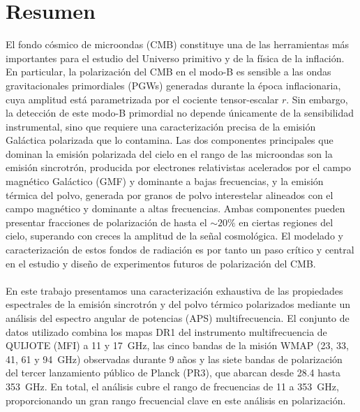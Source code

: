 \section*{Resumen}

El fondo cósmico de microondas (CMB) constituye una de las herramientas más importantes para el estudio del Universo primitivo y de la física de la inflación. En particular, la polarización del CMB en el modo-B es sensible a las ondas gravitacionales primordiales (PGWs) generadas durante la época inflacionaria, cuya amplitud está parametrizada por el cociente tensor-escalar $r$. Sin embargo, la detección de este modo-B primordial no depende únicamente de la sensibilidad instrumental, sino que requiere una caracterización precisa de la emisión Galáctica polarizada que lo contamina. Las dos componentes principales que dominan la emisión polarizada del cielo en el rango de las microondas son la emisión sincrotrón, producida por electrones relativistas acelerados por el campo magnético Galáctico (GMF) y dominante a bajas frecuencias, y la emisión térmica del polvo, generada por granos de polvo interestelar alineados con el campo magnético y dominante a altas frecuencias. Ambas componentes pueden presentar fracciones de polarización de hasta el $\sim 20\%$ en ciertas regiones del cielo, superando con creces la amplitud de la señal cosmológica. El modelado y caracterización de estos fondos de radiación es por tanto un paso crítico y central en el estudio y diseño de experimentos futuros de polarización del CMB.

\paragraph{}

En este trabajo presentamos una caracterización exhaustiva de las propiedades espectrales de la emisión sincrotrón y del polvo térmico polarizados mediante un análisis del espectro angular de potencias (APS) multifrecuencia. El conjunto de datos utilizado combina los mapas DR1 del instrumento multifrecuencia de QUIJOTE (MFI) a 11 y 17~GHz, las cinco bandas de la misión WMAP (23, 33, 41, 61 y 94~GHz) observadas durante 9 años y las siete bandas de polarización del tercer lanzamiento público de Planck (PR3), que abarcan desde 28.4 hasta 353~GHz. En total, el análisis cubre el rango de frecuencias de 11 a 353~GHz, proporcionando un gran rango frecuencial clave en este análisis en polarización.

\paragraph{}

